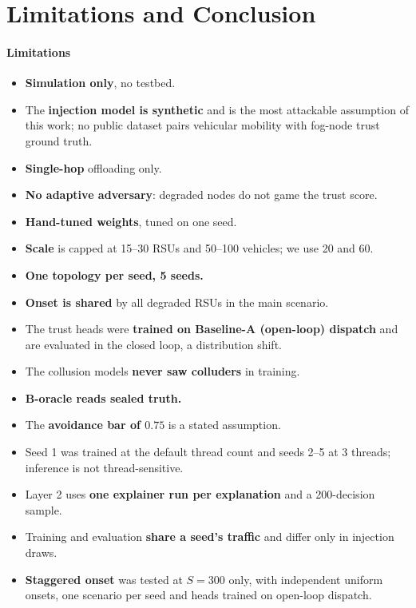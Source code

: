 \section{Limitations and Conclusion}
\label{sec:limits}

\paragraph*{Limitations}
\begin{itemize}
\item \textbf{Simulation only}, no testbed.
\item The \textbf{injection model is synthetic} and is the most attackable assumption of this work; no public dataset pairs vehicular mobility with fog-node trust ground truth.
\item \textbf{Single-hop} offloading only.
\item \textbf{No adaptive adversary}: degraded nodes do not game the trust score.
\item \textbf{Hand-tuned weights}, tuned on one seed.
\item \textbf{Scale} is capped at 15--30 RSUs and 50--100 vehicles; we use 20 and 60.
\item \textbf{One topology per seed, 5 seeds.}
\item \textbf{Onset is shared} by all degraded RSUs in the main scenario.
\item The trust heads were \textbf{trained on Baseline-A (open-loop) dispatch} and are evaluated in the closed loop, a distribution shift.
\item The collusion models \textbf{never saw colluders} in training.
\item \textbf{B-oracle reads sealed truth.}
\item The \textbf{avoidance bar of $0.75$} is a stated assumption.
\item Seed 1 was trained at the default thread count and seeds 2--5 at 3 threads; inference is not thread-sensitive.
\item Layer 2 uses \textbf{one explainer run per explanation} and a 200-decision sample.
\item Training and evaluation \textbf{share a seed's traffic} and differ only in injection draws.
\item \textbf{Staggered onset} was tested at $S=300$ only, with independent uniform onsets, one scenario per seed and heads trained on open-loop dispatch.

\end{itemize}
